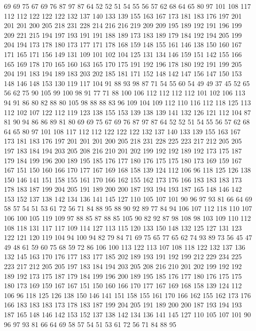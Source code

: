 69 69 75 67 69 76 87 97 87 64 52 52 51 54 55 56 57 62 68 64
65 80 97 101 108 117 112 112 122 122 122 132 137 140 133 139 155 163 167 173
181 183 176 197 201 201 201 200 205 218 231 228 214 216 216 219 209 209 195 189
192 191 196 199 209 221 215 194 197 193 191 191 188 189 173 183 189 179 184 192
194 205 199 204 194 173 178 180 173 177 171 178 168 159 148 155 161 146 138 150
160 167 171 165 171 156 149 131 109 101 102 104 125 131 134 146 159 151 142 155
166 165 169 178 170 165 160 163 165 170 175 191 192 196 178 180 192 191 199 205
204 191 183 194 189 183 203 202 185 181 171 152 148 142 147 156 147 150 153 148
146 148 153 130 119 117 104 91 88 93 98 87 71 54 55 60 54 49 49 37
45 52 65 56 62 75 90 105 99 100 98 91 77 71 88 100 106 112 112 112
112 101 102 106 113 94 91 86 80 82 88 80 105 98 88 88 83 96 109 104
109 112 110 116 112 118 125 113 112 102 107 122 112 119 123 138 155 153 139 138
139 141 132 126 121 112 104 87 81 90 94 86 86 89 81 80 69 69 75 67
69 76 87 97 87 64 52 52 51 54 55 56 57 62 68 64 65 80 97 101
108 117 112 112 122 122 122 132 137 140 133 139 155 163 167 173 181 183 176 197
201 201 201 200 205 218 231 228 225 223 217 212 205 205 197 183 184 194 203 205
208 216 210 201 202 199 192 192 189 192 173 175 187 179 184 199 196 200 189 195
185 176 177 180 176 175 175 180 173 169 159 167 167 151 150 160 166 170 177 167
169 168 158 139 124 112 106 96 118 125 126 138 150 146 141 151 158 155 161 170
166 162 155 162 173 176 166 183 183 183 173 178 183 187 199 204 205 191 189 200
200 187 193 194 193 187 165 148 146 142 153 152 137 138 142 134 136 141 145 127
110 105 107 101 90 96 97 93 81 66 64 69 58 57 54 51 53 61 72 56
71 84 88 95 88 90 92 89 77 84 94 106 107 112 118 110 107 106 100 105
119 109 97 88 85 87 88 85 105 90 82 92 87 98 108 98 103 109 110 112
108 118 131 117 117 109 114 127 113 115 120 133 150 148 132 125 127 131 123 122
121 120 119 104 94 100 94 82 79 84 71 69 75 65 77 65 62 74 93 89
73 56 45 47 49 48 61 59 60 75 68 59 72 86 106 100 113 122 113 107
108 118 122 132 137 136 132 145 163 170 176 177 183 177 185 202 189 193 191 192
199 212 229 234 225 223 217 212 205 205 197 183 184 194 203 205 208 216 210 201
202 199 192 192 189 192 173 175 187 179 184 199 196 200 189 195 185 176 177 180
176 175 175 180 173 169 159 167 167 151 150 160 166 170 177 167 169 168 158 139
124 112 106 96 118 125 126 138 150 146 141 151 158 155 161 170 166 162 155 162
173 176 166 183 183 183 173 178 183 187 199 204 205 191 189 200 200 187 193 194
193 187 165 148 146 142 153 152 137 138 142 134 136 141 145 127 110 105 107 101
90 96 97 93 81 66 64 69 58 57 54 51 53 61 72 56 71 84 88 95
